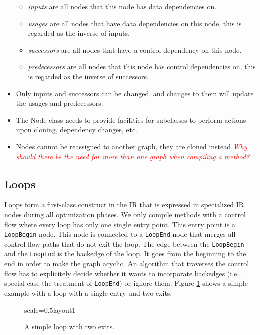 \documentclass[twocolumn]{svjour3}
\newcommand{\mynote}[2]{
\textcolor{red}{\fbox{\bfseries\sffamily\scriptsize#1}
  {\small\textsf{\emph{#2}}}
\fbox{\bfseries\sffamily\scriptsize }}}
\newcommand\cw[1]{\mynote{CW}{#1}}
\newcommand\nodename[1]{\texttt{#1}}
\begin{document}
\begin{itemize}
    \begin{itemize}
        \item \emph{inputs} are all nodes that this node has data dependencies on.
        \item \emph{usages} are all nodes that have data dependencies on this node, this is regarded as the inverse of inputs.
        \item \emph{successors} are all nodes that have a control dependency on this node.
        \item \emph{predecessors} are all nodes that this node has control dependencies on, this is regarded as the inverse of successors.
    \end{itemize}
    \item Only inputs and successors can be changed, and changes to them will update the usages and predecessors.
    \item The Node class needs to provide facilities for subclasses to perform actions upon cloning, dependency changes, etc.
    \item Nodes cannot be reassigned to another graph, they are cloned instead \cw{Why should there be the need for more than one graph when compiling a method?}
\end{itemize}

\subsection{Loops}
\label{sec:loops}
Loops form a first-class construct in the IR that is expressed in specialized IR nodes during all optimization phases.
We only compile methods with a control flow where every loop has only one single entry point.
This entry point is a \nodename{LoopBegin} node.
This node is connected to a \nodename{LoopEnd} node that merges all control flow paths that do not exit the loop.
The edge between the \nodename{LoopBegin} and the \nodename{LoopEnd} is the backedge of the loop.
It goes from the beginning to the end in order to make the graph acyclic.
An algorithm that traverses the control flow has to explicitely decide whether it wants to incorporate backedges (i.e., special case the treatment of \nodename{LoopEnd}) or ignore them.
Figure \ref{fig:loop1} shows a simple example with a loop with a single entry and two exits.

\begin{figure}[h]
  \label{fig:loop1}
  \centering
\begin{digraphenv}{scale=0.5}{layout1}
\end{digraphenv}
  \caption{A simple loop with two exits.}
\end{figure}
\end{document}
